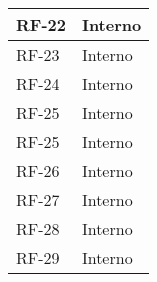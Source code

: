 \begin{longtable}{|>{\centering\arraybackslash}m{}|>{\centering\arraybackslash}m{}|}
	RF-22              & Interno                                                                                                                                                                                                                                              \\\hline
	RF-23              & Interno                                                                                                                                                                                                                                              \\\hline
	RF-24              & Interno                                                                                                                                                                                                                                              \\\hline
	RF-25              & Interno                                                                                                                                                                                                                                              \\\hline
	RF-25              & Interno                                                                                                                                                                                                                                              \\\hline
	RF-26              & Interno                                                                                                                                                                                                                                              \\\hline
	RF-27              & Interno                                                                                                                                                                                                                                              \\\hline
	RF-28              & Interno                                                                                                                                                                                                                                              \\\hline
	RF-29              & Interno                                                                                                                                                                                                                                              \\\hline

\end{longtable}
